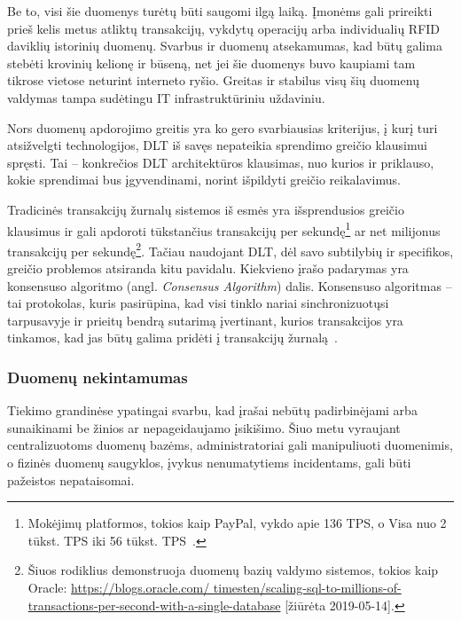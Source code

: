 Be to, visi šie duomenys turėtų būti saugomi ilgą laiką. Įmonėms gali prireikti prieš kelis metus atliktų transakcijų, vykdytų operacijų arba individualių RFID daviklių istorinių duomenų. Svarbus ir duomenų atsekamumas, kad būtų galima stebėti krovinių kelionę ir būseną, net jei šie duomenys buvo kaupiami tam tikrose vietose neturint interneto ryšio. Greitas ir stabilus visų šių duomenų valdymas tampa sudėtingu IT infrastruktūriniu uždaviniu.

Nors duomenų apdorojimo greitis yra ko gero svarbiausias kriterijus, į kurį turi atsižvelgti technologijos, DLT iš savęs nepateikia sprendimo greičio klausimui spręsti. Tai – konkrečios DLT architektūros klausimas, nuo kurios ir priklauso, kokie sprendimai bus įgyvendinami, norint išpildyti greičio reikalavimus.

Tradicinės transakcijų žurnalų sistemos iš esmės yra išsprendusios greičio klausimus ir gali apdoroti tūkstančius transakcijų per sekundę\footnote{Mokėjimų platformos, tokios kaip PayPal, vykdo apie 136 TPS, o Visa nuo 2 tūkst. TPS iki 56 tūkst. TPS~\cite{herrera2016privacy}.} ar net milijonus transakcijų per sekundę\footnote{Šiuos rodiklius demonstruoja duomenų bazių valdymo sistemos, tokios kaip Oracle: \href{https://blogs.oracle.com/timesten/scaling-sql-to-millions-of-transactions-per-second-with-a-single-database}{https://blogs.oracle.com/ timesten/scaling-sql-to-millions-of-transactions-per-second-with-a-single-database} [žiūrėta 2019-05-14].}. Tačiau naudojant DLT, dėl savo subtilybių ir specifikos, greičio problemos atsiranda kitu pavidalu. Kiekvieno įrašo padarymas yra konsensuso algoritmo (angl. \textit{Consensus Algorithm}) dalis. Konsensuso algoritmas – tai protokolas, kuris pasirūpina, kad visi tinklo nariai sinchronizuotųsi tarpusavyje ir prieitų bendrą sutarimą įvertinant, kurios transakcijos yra tinkamos, kad jas būtų galima pridėti į transakcijų žurnalą~\cite{cachin2017blockchain}. 




\subsubsection{Duomenų nekintamumas} \label{subsection:dlt-immutability}

Tiekimo grandinėse ypatingai svarbu, kad įrašai nebūtų padirbinėjami arba sunaikinami be žinios ar nepageidaujamo įsikišimo. Šiuo metu vyraujant centralizuotoms duomenų bazėms, administratoriai gali manipuliuoti duomenimis, o fizinės duomenų saugyklos, įvykus nenumatytiems incidentams, gali būti pažeistos nepataisomai.

